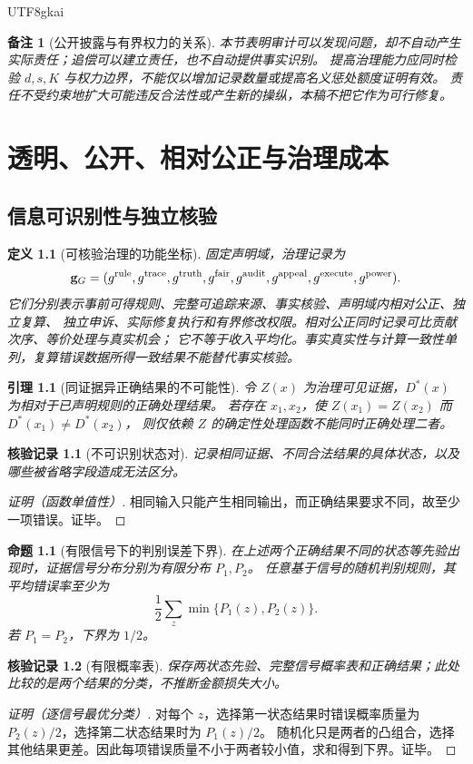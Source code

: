 \documentclass[12pt,a4paper,openany]{report}
\newtheorem{definition}{定义}[chapter]
\newtheorem{lemma}{引理}[chapter]
\newtheorem{proposition}{命题}[chapter]
\newtheorem{remark}{备注}[chapter]
\newtheorem{Certificate}{核验记录}[chapter]
\begin{document}
\begin{CJK*}{UTF8}{gkai}
\begin{remark}[公开披露与有界权力的关系]
本节表明审计可以发现问题，却不自动产生实际责任；追偿可以建立责任，也不自动提供事实识别。
提高治理能力应同时检验 $d,s,K$ 与权力边界，不能仅以增加记录数量或提高名义惩处额度证明有效。
责任不受约束地扩大可能违反合法性或产生新的操纵，本稿不把它作为可行修复。
\end{remark}

\chapter{透明、公开、相对公正与治理成本}
\label{chap:governance}

\section{信息可识别性与独立核验}

\begin{definition}[可核验治理的功能坐标]
\label{def:governance-vector}
固定声明域，治理记录为
\[
 \mathbf g_G=(g^{\rm rule},g^{\rm trace},g^{\rm truth},g^{\rm fair},
 g^{\rm audit},g^{\rm appeal},g^{\rm execute},g^{\rm power}).
\]
它们分别表示事前可得规则、完整可追踪来源、事实核验、声明域内相对公正、独立复算、
独立申诉、实际修复执行和有界修改权限。相对公正同时记录可比贡献次序、等价处理与真实机会；
它不等于收入平均化。事实真实性与计算一致性单列，复算错误数据所得一致结果不能替代事实核验。
\end{definition}

\begin{lemma}[同证据异正确结果的不可能性]
\label{lem:information-necessity}
令 $Z(x)$ 为治理可见证据，$D^*(x)$ 为相对于已声明规则的正确处理结果。
若存在 $x_1,x_2$，使 $Z(x_1)=Z(x_2)$ 而 $D^*(x_1)\ne D^*(x_2)$，
则仅依赖 $Z$ 的确定性处理函数不能同时正确处理二者。
\end{lemma}
\begin{Certificate}[不可识别状态对]
记录相同证据、不同合法结果的具体状态，以及哪些被省略字段造成无法区分。
\end{Certificate}
\begin{proof}[证明（函数单值性）]
相同输入只能产生相同输出，而正确结果要求不同，故至少一项错误。证毕。
\end{proof}

\begin{proposition}[有限信号下的判别误差下界]
\label{prop:signal-error}
在上述两个正确结果不同的状态等先验出现时，证据信号分布分别为有限分布 $P_1,P_2$。
任意基于信号的随机判别规则，其平均错误率至少为
\[
 \frac12\sum_z\min\{P_1(z),P_2(z)\}.
\]
若 $P_1=P_2$，下界为 $1/2$。
\end{proposition}
\begin{Certificate}[有限概率表]
保存两状态先验、完整信号概率表和正确结果；此处比较的是两个结果的分类，不推断金额损失大小。
\end{Certificate}
\begin{proof}[证明（逐信号最优分类）]
对每个 $z$，选择第一状态结果时错误概率质量为 $P_2(z)/2$，选择第二状态结果时为 $P_1(z)/2$。
随机化只是两者的凸组合，选择其他结果更差。因此每项错误质量不小于两者较小值，求和得到下界。证毕。
\end{proof}


\end{CJK*}
\end{document}
